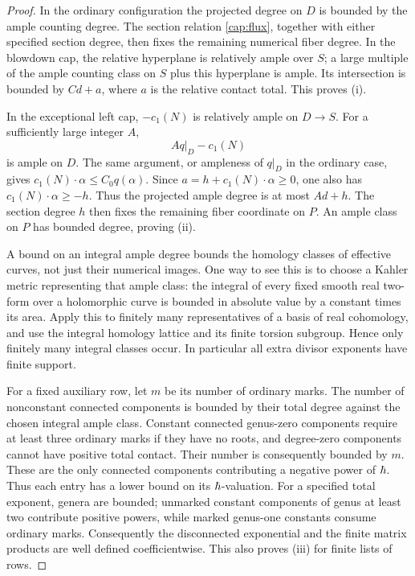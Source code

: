 \begin{proof}
In the ordinary configuration the projected degree on $D$ is bounded
by the ample counting degree.  The section relation
\eqref{cap:flux}, together with either specified section degree,
then fixes the remaining numerical fiber degree.  In the blowdown
cap, the relative hyperplane is relatively ample over $S$; a large
multiple of the ample counting class on $S$ plus this hyperplane is
ample.  Its intersection is bounded by $C d+a$, where $a$ is the
relative contact total.  This proves (i).

In the exceptional left cap, $-c_1(N)$ is relatively ample on
$D\to S$.  For a sufficiently large integer $A$,
\[
        A q|_D-c_1(N)
\]
is ample on $D$.  The same argument, or ampleness of $q|_D$ in the
ordinary case, gives $c_1(N)\cdot\alpha\leq C_0q(\alpha)$.
Since $a=h+c_1(N)\cdot\alpha\geq0$, one also has
$c_1(N)\cdot\alpha\geq-h$.  Thus the projected ample degree is
at most $Ad+h$.  The section degree $h$ then fixes the remaining
fiber coordinate on $P$.  An ample class on $P$ has bounded degree,
proving (ii).

A bound on an integral ample degree bounds the homology classes of
effective curves, not just their numerical images.  One way to see
this is to choose a Kahler metric representing that ample class:
the integral of every fixed smooth real two-form over a holomorphic
curve is bounded in absolute value by a constant times its area.
Apply this to finitely many representatives of a basis of real
cohomology, and use the integral homology lattice and its finite
torsion subgroup.  Hence only finitely many integral classes occur.
In particular all extra divisor exponents have finite support.

For a fixed auxiliary row, let $m$ be its number of ordinary marks.
The number of nonconstant connected components is bounded by their
total degree against the chosen integral ample class.  Constant
connected genus-zero components require at least three ordinary
marks if they have no roots, and degree-zero components cannot have
positive total contact.  Their number is consequently bounded by
$m$.  These are the only connected components contributing a negative
power of $\hbar$.  Thus each entry has a lower bound on its
$\hbar$-valuation.  For a specified total exponent, genera are bounded;
unmarked constant components of genus at least two contribute
positive powers, while marked genus-one constants consume ordinary
marks.  Consequently the disconnected exponential and the finite
matrix products are well defined coefficientwise.  This also proves
(iii) for finite lists of rows.
\end{proof}

